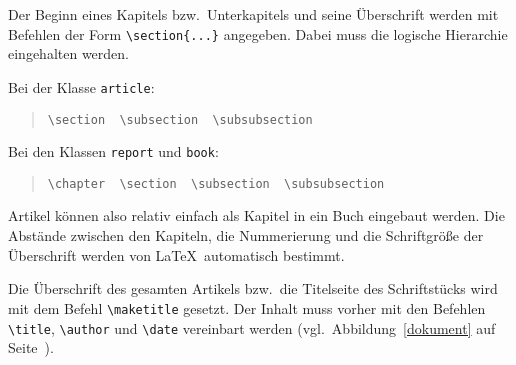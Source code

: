 Der Beginn eines Kapitels bzw.\ Unterkapitels und seine
Überschrift werden mit Befehlen der Form \verb|\section{...}|
angegeben. Dabei muss die logische Hierarchie eingehalten werden.

\pagebreak[3] %
\noindent Bei der Klasse \texttt{article}:
\begin{quote}
\verb|\section  \subsection  \subsubsection|
\end{quote}
Bei den Klassen \texttt{report} und \texttt{book}:
\begin{quote}
\verb|\chapter  \section  \subsection  \subsubsection|
\end{quote}
Artikel können also relativ einfach als Kapitel in ein Buch
eingebaut werden.  Die Abstände zwischen den Kapiteln, die
Nummerierung und die Schriftgröße der Überschrift werden von
\LaTeX\ automatisch bestimmt.


Die Überschrift des gesamten Artikels bzw.\ die Titelseite des
Schriftstücks wird mit dem Befehl \verb|\maketitle| gesetzt.
Der Inhalt muss vorher mit den Befehlen \verb|\title|,
\verb|\author| und \verb|\date| vereinbart werden (vgl.\ 
Abbildung~\ref{dokument} auf Seite~\pageref{dokument}).

